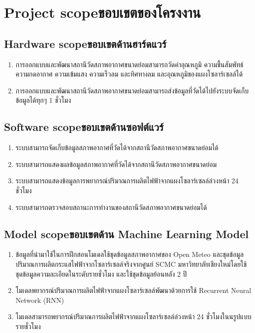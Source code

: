 \section{\ifenglish Project scope\else ขอบเขตของโครงงาน\fi}

\subsection{\ifenglish Hardware scope\else ขอบเขตด้านฮาร์ดแวร์\fi}
\begin{enumerate}
    \item การออกแบบและพัฒนาสถานีวัดสภาพอากาศขนาดย่อมสามารถวัดค่าอุณหภูมิ ความชื้นสัมพัทธ์ ความกดอากาศ ความเข้มแสง ความเร็วลม และทิศทางลม และอุณหภูมิของแผงโซลาร์เซลล์ได้
    \item การออกแบบและพัฒนาสถานีวัดสภาพอากาศขนาดย่อมสามารถส่งข้อมูลที่วัดได้ไปยังระบบจัดเก็บข้อมูลได้ทุกๆ 1 ชั่วโมง
\end{enumerate}

\subsection{\ifenglish Software scope\else ขอบเขตด้านซอฟต์แวร์\fi}
\begin{enumerate}
    \item ระบบสามารถจัดเก็บข้อมูลสภาพอากาศที่วัดได้จากสถานีวัดสภาพอากาศขนาดย่อมได้
    \item ระบบสามารถแสดงผลข้อมูลสภาพอากาศที่วัดได้จากสถานีวัดสภาพอากาศขนาดย่อม
    \item ระบบสามารถแสดงข้อมูลการพยากรณ์ปริมาณการผลิตไฟฟ้าจากแผงโซลาร์เซลล์ล่วงหน้า 24 ชั่วโมง
    \item ระบบสามารถตรวจสอบสถานะการทำงานของสถานีวัดสภาพอากาศขนาดย่อมได้
\end{enumerate}

\subsection{\ifenglish Model scope\else ขอบเขตด้าน Machine Learning Model\fi}
\begin{enumerate}
    \item ข้อมูลที่นำมาใช้ในการฝึกสอนโมเดลใช้ชุดข้อมูลสภาพอากาศของ Open Meteo และชุดข้อมูลปริมาณการผลิตกระแสไฟฟ้าจากโซลาร์เซลล์จริงจากศูนย์ SCMC มหาวิทยาลัยเชียงใหม่โดยใช้ชุดข้อมูลความละเอียดในระดับรายชั่วโมง และใช้ชุดข้อมูลย้อนหลัง 2 ปี
    \item โมเดลพยากรณ์ปริมาณการผลิตไฟฟ้าจากแผงโซลาร์เซลล์พัฒนาด้วยการใช้ Recurrent Neural Network (RNN)
    \item โมเดลสามารถพยากรณ์ปริมาณการผลิตไฟฟ้าจากแผงโซลาร์เซลล์ล่วงหน้า 24 ชั่วโมงในนรูปแบบรายชั่วโมง
\end{enumerate}




